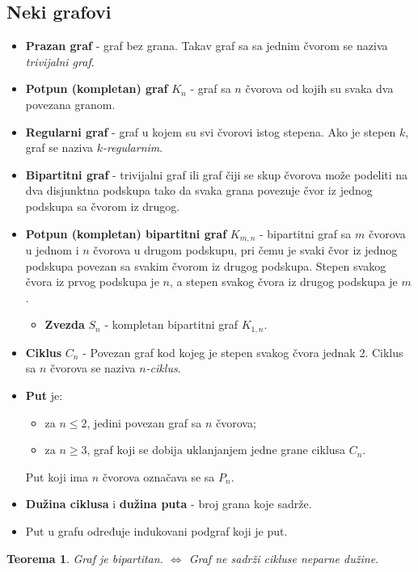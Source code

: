 \documentclass[a4paper,12pt]{article}
\numberwithin{algorithm}{section}
\theoremstyle{plain}
\newtheorem{theorem}{Teorema}[section]
\theoremstyle{definition}
\theoremstyle{remark}
\begin{document}
\subsection{Neki grafovi}
\begin{itemize}
    \item \textbf{Prazan graf} - graf bez grana. Takav graf sa sa jednim čvorom se naziva \textit{trivijalni graf}.
    \item \textbf{Potpun (kompletan) graf} $K_n$ - graf sa $n$ čvorova od kojih su svaka dva povezana granom.
    \item \textbf{Regularni graf} - graf u kojem su svi čvorovi istog stepena. Ako je stepen $k$, graf se naziva \textit{$k$-regularnim}.
    \item \textbf{Bipartitni graf} - trivijalni graf ili graf čiji se skup čvorova može podeliti na dva disjunktna podskupa tako da svaka grana povezuje čvor iz jednog podskupa sa čvorom iz drugog.
    \newpage
    \item \textbf{Potpun (kompletan) bipartitni graf} $K_{m, n}$ - bipartitni graf sa $m$ čvorova u jednom i $n$ čvorova u drugom podskupu, pri čemu je svaki čvor iz jednog podskupa povezan sa svakim čvorom iz drugog podskupa. Stepen svakog čvora iz prvog podskupa je $n$, a stepen svakog čvora iz drugog podskupa je $m$.
    \begin{itemize}
        \item \textbf{Zvezda} $S_n$ - kompletan bipartitni graf $K_{1, n}$.
    \end{itemize}
    \item \textbf{Ciklus} $C_n$ - Povezan graf kod kojeg je stepen svakog čvora jednak 2. Ciklus sa $n$ čvorova se naziva \textit{$n$-ciklus}.
    \item \textbf{Put} je:
    \begin{itemize}
        \item za $n \leq 2$, jedini povezan graf sa $n$ čvorova;
        \item za $n \geq 3$, graf koji se dobija uklanjanjem jedne grane ciklusa $C_n$.
    \end{itemize} Put koji ima $n$ čvorova označava se sa $P_n$.
    \item  \textbf{Dužina ciklusa} i \textbf{dužina puta} - broj grana koje sadrže.
    \item Put u grafu određuje indukovani podgraf koji je put.
\end{itemize}
\begin{theorem}
    Graf je bipartitan. $\iff$ Graf ne sadrži cikluse neparne dužine.
\end{theorem}
\end{document}
